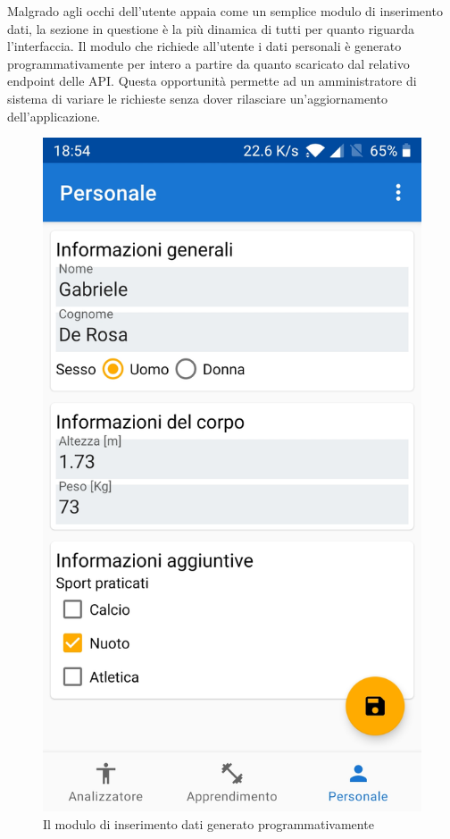 Malgrado agli occhi dell'utente appaia come un semplice modulo di inserimento dati, la sezione in questione è la più dinamica di tutti 
per quanto riguarda l'interfaccia. 
Il modulo che richiede all'utente i dati personali è generato programmativamente per intero a partire da quanto scaricato dal 
relativo endpoint delle API. Questa opportunità permette ad un amministratore di sistema di variare le richieste 
senza dover rilasciare un'aggiornamento dell'applicazione.

\begin{figure}[H]
    \centering
    \includegraphics[scale = 0.1019]{assets/images/screenshots/3a_Init.jpg}    
    \caption{Il modulo di inserimento dati generato programmativamente}
    \label{fig:screenshots_personal}
\end{figure}



